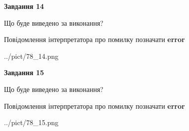 \documentclass[11pt, ukrainian]{article}
\begin{document}
{\begin {large}
{\begin {center}\textbf{Завдання 14}\end {center}}\par
Що буде виведено за виконання? \par
Повідомлення інтерпретатора про помилку позначати \textbf{error}

\begin{center}
	{../pict/78_14.png}
\end{center}
\newpage

{\begin {center}\textbf{Завдання 15}\end {center}}\par
Що буде виведено за виконання? \par
Повідомлення інтерпретатора про помилку позначати \textbf{error}

\begin{center}
	{../pict/78_15.png}
\end{center}
\newpage

\end {large}}
\end{document}
